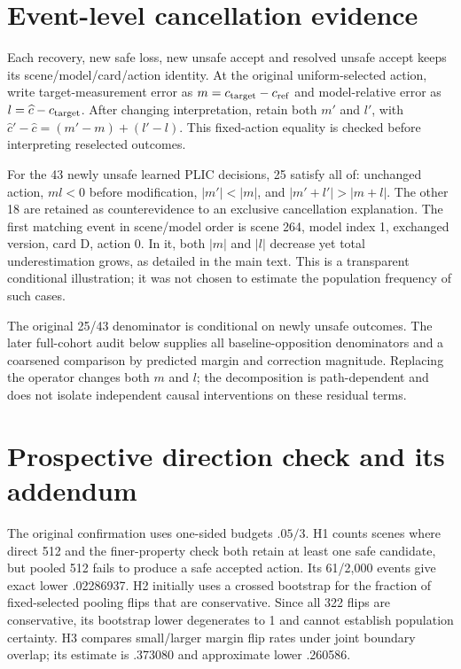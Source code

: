 \section{Event-level cancellation evidence}
Each recovery, new safe loss, new unsafe accept and resolved unsafe accept keeps
its scene/model/card/action identity. At the original uniform-selected action,
write target-measurement error as $ m=c_{\rm target}-c_{\mathrm{ref}} $ and model-relative
error as $ l=\widehat c-c_{\rm target}$. After changing interpretation, retain both
$ m'$ and $ l'$, with
$\widehat c'-\widehat c=(m'-m)+(l'-l)$. This fixed-action equality is checked
before interpreting reselected outcomes.

For the 43 newly unsafe learned PLIC decisions, 25 satisfy all of: unchanged
action, $ ml<0$ before modification, $|m'|<|m|$, and
$|m'+l'|>|m+l|$. The other 18 are retained as counterevidence to an exclusive
cancellation explanation. The first matching event in scene/model order is
scene 264, model index 1, exchanged version, card D, action 0. In it, both $|m|$
and $|l|$ decrease yet total underestimation grows, as detailed in the main text.
This is a transparent conditional illustration; it was not chosen to estimate
the population frequency of such cases.



The original 25/43 denominator is conditional on newly unsafe outcomes. The later
full-cohort audit below supplies all baseline-opposition denominators and a
coarsened comparison by predicted margin and correction magnitude. Replacing
the operator changes both $m$ and $l$; the decomposition is path-dependent and
does not isolate independent causal interventions on these residual terms.

\section{Prospective direction check and its addendum}
\label{app:direction}
The original confirmation uses one-sided budgets $.05/3$. H1 counts scenes where
direct 512 and the finer-property check both retain at least one safe candidate,
but pooled 512 fails to produce a safe accepted action. Its 61/2,000 events give
exact lower .02286937. H2 initially uses a crossed bootstrap for the fraction of
fixed-selected pooling flips that are conservative. Since all 322 flips are
conservative, its bootstrap lower degenerates to 1 and cannot establish population
certainty. H3 compares small/larger margin flip rates under joint boundary
overlap; its estimate is .373080 and approximate lower .260586.

